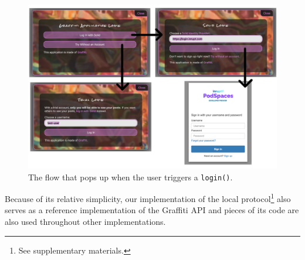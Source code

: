 \begin{figure}[h]
    \includegraphics[width=\textwidth]{figures/login.png}
    \caption{The flow that pops up when the user triggers a \texttt{login()}.}
    \label{above-and-below:figure:login}
\end{figure}

Because of its relative simplicity, our implementation of the local protocol\footnote{
    See supplementary materials.
} also serves
as a reference implementation of the Graffiti API and pieces of its code are also used
throughout other implementations.






